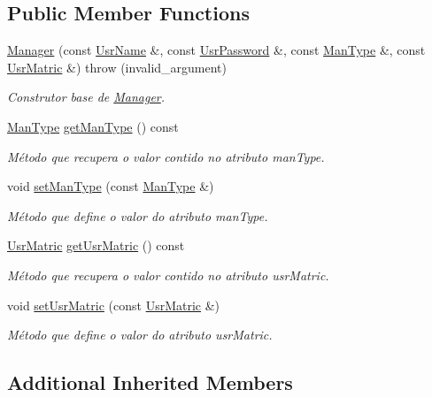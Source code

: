 \subsection*{Public Member Functions}
\begin{DoxyCompactItemize}
\item 
\hyperlink{classManager_ad2ee8089f5e80bc03fabcf9a493d045b}{Manager} (const \hyperlink{classUsrName}{Usr\-Name} \&, const \hyperlink{classUsrPassword}{Usr\-Password} \&, const \hyperlink{classUsrType}{Man\-Type} \&, const \hyperlink{classUsrMatric}{Usr\-Matric} \&)  throw (invalid\-\_\-argument)
\begin{DoxyCompactList}\small\item\em Construtor base de \hyperlink{classManager}{Manager}. \end{DoxyCompactList}\item 
\hyperlink{classUsrType}{Man\-Type} \hyperlink{classManager_a255ac6a7e2112631001296fa8db3811b}{get\-Man\-Type} () const 
\begin{DoxyCompactList}\small\item\em Método que recupera o valor contido no atributo man\-Type. \end{DoxyCompactList}\item 
void \hyperlink{classManager_a3d4e9cb6cc0e8d9be47fcc086b4e584e}{set\-Man\-Type} (const \hyperlink{classUsrType}{Man\-Type} \&)
\begin{DoxyCompactList}\small\item\em Método que define o valor do atributo man\-Type. \end{DoxyCompactList}\item 
\hyperlink{classUsrMatric}{Usr\-Matric} \hyperlink{classManager_a462f3704b016b57e087db417df73f07a}{get\-Usr\-Matric} () const 
\begin{DoxyCompactList}\small\item\em Método que recupera o valor contido no atributo usr\-Matric. \end{DoxyCompactList}\item 
void \hyperlink{classManager_a93309a0dde84dd0b5fe90d9e1da49822}{set\-Usr\-Matric} (const \hyperlink{classUsrMatric}{Usr\-Matric} \&)
\begin{DoxyCompactList}\small\item\em Método que define o valor do atributo usr\-Matric. \end{DoxyCompactList}\end{DoxyCompactItemize}
\subsection*{Additional Inherited Members}


